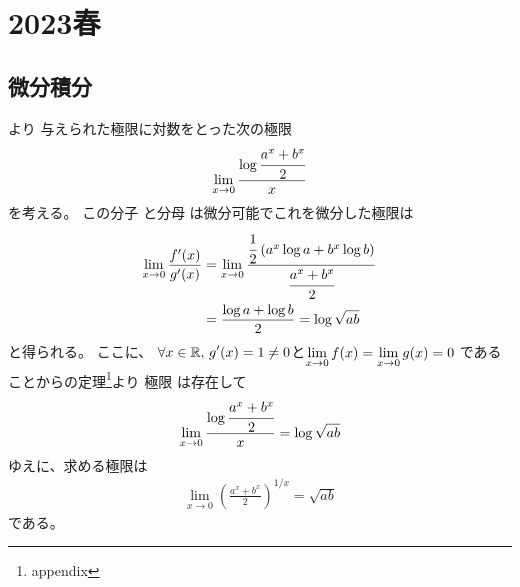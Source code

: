 \section{2023春}

\subsection{微分積分}

\begin{ans*}
  より
  与えられた極限に対数をとった次の極限
  \begin{gather}
    \lim_{x\to 0} \frac{\log \cfrac{a^x + b^x}{2}}{x}
  \end{gather}
  を考える。
  この分子
  と分母
  は微分可能でこれを微分した極限は
  \begin{align}
    \lim_{x\to 0} \frac{f'(x)}{g'(x)}
    &=\lim_{x\to 0} \frac{\cfrac{1}{2}\;(a^x\log a+b^x\log b)}{\cfrac{a^x + b^x}{2}} \\
    &= \frac{\log a + \log b}{2} = \log \sqrt{ab}
  \end{align}
  と得られる。
  ここに、
  $\displaystyle\forall x\in\mathbb{R},\,\displaystyle g'(x) = 1 \neq 0 $と$\displaystyle \lim_{x\to 0}f(x) = \lim_{x\to 0}g(x) = 0$
  であることから\lhopital の定理\footnote{appendix}より
  極限
  は存在して
  \begin{gather}
    \lim_{x\to 0} \frac{\log \cfrac{a^x + b^x}{2}}{x} = \log\sqrt{ab}
  \end{gather}
  ゆえに、求める極限は
  \begin{align}
    \lim_{x\to 0}\left(\frac{a^x+b^x}{2}\right)^{1/x}
     = \sqrt{ab}
  \end{align}
  である。
\end{ans*}


